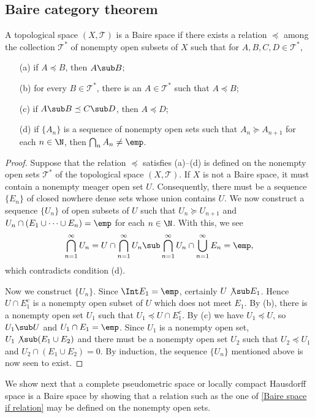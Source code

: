 \subsection{Baire category theorem}
\begin{proposition}\label{Baire space if relation}
A topological space $(X,\mathcal{T})$ is a Baire space if there exists a relation $\preceq$ among the collection $\mathcal{T}^*$ of nonempty open subsets of $X$ such that for $A,B,C,D\in\mathcal{T}^*$,
\begin{itemize}
\item[(a)] if $A\preceq B$, then $A\sub B$;
\item[(b)] for every $B\in\mathcal{T}^*$, there is an $A\in\mathcal{T}^*$ such that $A\preceq B$;
\item[(c)] if $A\sub B\preceq C\sub D$, then $A\preceq D$;
\item[(d)] if $\{A_n\}$ is a sequence of nonempty open sets such that $A_n\succeq A_{n+1}$ for each $n\in\N$, then $\bigcap_nA_n\neq\emp$.
\end{itemize}
\end{proposition}
\begin{proof}
Suppose that the relation $\preceq$ satisfies (a)--(d) is defined on the nonempty open sets $\mathcal{T}^*$ of the topological space $(X,\mathcal{T})$. If $X$ is not a Baire space, it must contain a nonempty meager open set $U$. Consequently, there must be a sequence $\{E_n\}$ of closed nowhere dense sets whose union contains $U$. We now construct a sequence $\{U_n\}$ of open subsets of $U$ such that $U_n\succeq U_{n+1}$ and $U_n\cap(E_1\cup\cdots\cup E_n)=\emp$ for each $n\in\N$. With this, we see
\[\bigcap_{n=1}^{\infty}U_n=U\cap\bigcap_{n=1}^{\infty}U_n\sub\bigcap_{n=1}^{\infty}U_n\cap\bigcup_{n=1}^{\infty}E_n=\emp,\]
which contradicts condition (d).\par
Now we construct $\{U_n\}$. Since $\Int E_1=\emp$, certainly $U\not\sub E_1$. Hence $U\cap E_1^c$ is a nonempty open subset of $U$ which does not meet $E_1$. By (b), there is a nonempty open set $U_1$ such that $U_1\preceq U\cap E_1^c$. By (c) we have $U_1\preceq U$, so $U_1\sub U$ and $U_1\cap E_1=\emp$. Since $U_1$ is a nonempty open set, $U_1\not\sub(E_1\cup E_2)$ and there must be a nonempty open set $U_2$ such that $U_2\preceq U_1$ and $U_2\cap (E_1\cup E_2)=0$. By induction, the sequence $\{U_n\}$ mentioned above is now seen to exist.
\end{proof}
We show next that a complete pseudometric space or locally compact Hausdorff space is a Baire space by showing that a relation such as the one of \cref{Baire space if relation} may be defined on the nonempty open sets.
